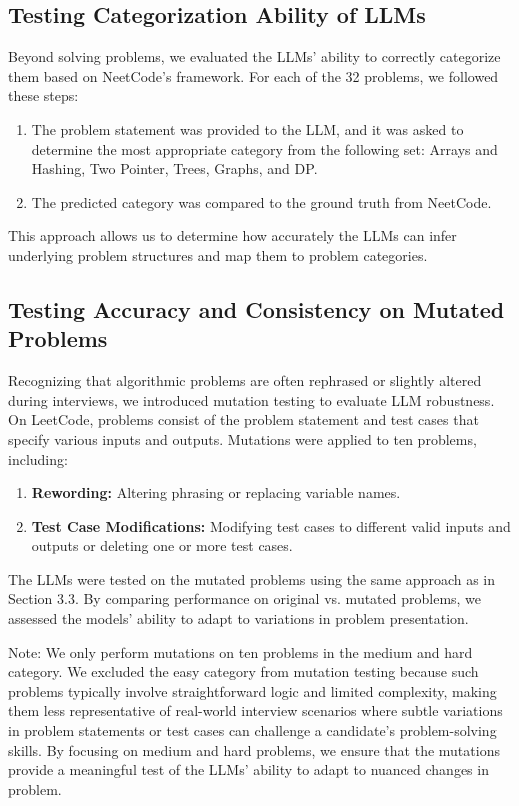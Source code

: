 \documentclass[times, 10pt,twocolumn]{article}
\begin{document}
\subsection{Testing Categorization Ability of LLMs}
Beyond solving problems, we evaluated the LLMs' ability to correctly categorize them based on NeetCode's framework. For each of the 32 problems, we followed these steps:

\begin{enumerate}
    \item The problem statement was provided to the LLM, and it was asked to determine the most appropriate category from the following set: Arrays and Hashing, Two Pointer, Trees, Graphs, and DP.
    \item The predicted category was compared to the ground truth from NeetCode.
\end{enumerate}

This approach allows us to determine how accurately the LLMs can infer underlying problem structures and map them to problem categories.

\subsection{Testing Accuracy and Consistency on Mutated Problems}

Recognizing that algorithmic problems are often rephrased or slightly altered during interviews, we introduced mutation testing to evaluate LLM robustness. On LeetCode, problems consist of the problem statement and test cases that specify various inputs and outputs. Mutations were applied to ten problems, including:
\begin{enumerate}
    \item \textbf{Rewording:} Altering phrasing or replacing variable names.
    \item \textbf{Test Case Modifications:} Modifying test cases to different valid inputs and outputs or deleting one or more test cases.
\end{enumerate}

The LLMs were tested on the mutated problems using the same approach as in Section 3.3. By comparing performance on original vs. mutated problems, we assessed the models' ability to adapt to variations in problem presentation.

Note: We only perform mutations on ten problems in the medium and hard category. We excluded the easy category from mutation testing because such problems typically involve straightforward logic and limited complexity, making them less representative of real-world interview scenarios where subtle variations in problem statements or test cases can challenge a candidate's problem-solving skills. By focusing on medium and hard problems, we ensure that the mutations provide a meaningful test of the LLMs’ ability to adapt to nuanced changes in problem.
\end{document}
